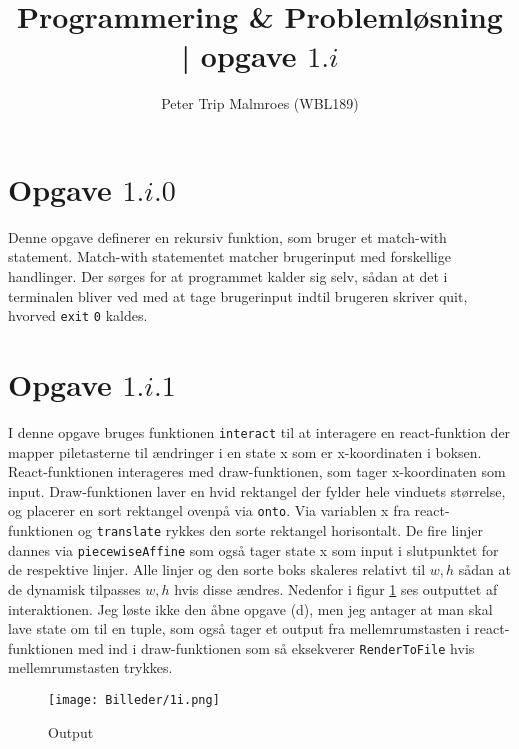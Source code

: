 \documentclass[a4paper]{article}
\title{Programmering \& Problemløsning | opgave $1.i$}
\author{Peter Trip Malmroes (WBL189) }
\begin{document}
\maketitle %

\section*{Opgave $1.i.0$}

Denne opgave definerer en rekursiv funktion, som bruger et match-with statement. Match-with statementet matcher brugerinput med forskellige handlinger. Der sørges for at programmet kalder sig selv, sådan at det i terminalen bliver ved med at tage brugerinput indtil brugeren skriver quit, hvorved \verb|exit| \verb|0| kaldes. 

\section*{Opgave $1.i.1$}

I denne opgave bruges funktionen \verb|interact| til at interagere en react-funktion der mapper piletasterne til ændringer i en state x som er x-koordinaten i boksen. React-funktionen interageres med draw-funktionen, som tager x-koordinaten som input. Draw-funktionen laver en hvid rektangel der fylder hele vinduets størrelse, og placerer en sort rektangel ovenpå via \verb|onto|. Via variablen x fra react-funktionen og \verb|translate| rykkes den sorte rektangel horisontalt. De fire linjer dannes via \verb|piecewiseAffine| som også tager state x som input i slutpunktet for de respektive linjer. Alle linjer og den sorte boks skaleres relativt til $w,h$ sådan at de dynamisk tilpasses $w,h$ hvis disse ændres. Nedenfor i figur \ref{fig: Output} ses outputtet af interaktionen. Jeg løste ikke den åbne opgave (d), men jeg antager at man skal lave state om til en tuple, som også tager et output fra mellemrumstasten i react-funktionen med ind i draw-funktionen som så eksekverer \verb|RenderToFile| hvis mellemrumstasten trykkes.

\begin{figure}[h!]
  \texttt{[image: Billeder/1i.png]}
  \caption{Output}
  \label{fig: Output}
\end{figure}
\end{document}
